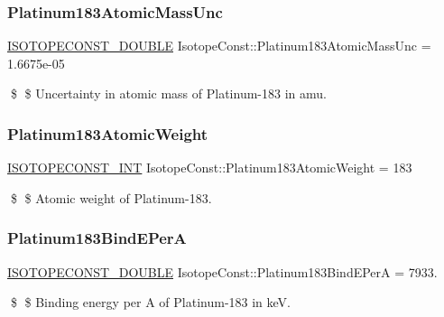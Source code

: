 \subsubsection{\texorpdfstring{Platinum183\+Atomic\+Mass\+Unc}{Platinum183AtomicMassUnc}}
{\footnotesize\ttfamily \mbox{\hyperlink{group___isotope_const-_macros_ga8f45a7272ce02c0b4c65c44636ed719a}{I\+S\+O\+T\+O\+P\+E\+C\+O\+N\+S\+T\+\_\+\+D\+O\+U\+B\+LE}} Isotope\+Const\+::\+Platinum183\+Atomic\+Mass\+Unc = 1.\+6675e-\/05}

\$ \$ Uncertainty in atomic mass of Platinum-\/183 in amu. \mbox{\label{group___isotope_const-_platinum-_pt183_gac12c7d0bb8e31dc3f8402b316737b49b}} 
\subsubsection{\texorpdfstring{Platinum183\+Atomic\+Weight}{Platinum183AtomicWeight}}
{\footnotesize\ttfamily \mbox{\hyperlink{group___isotope_const-_macros_ga5f18360b3e99483a35c32d789e62621c}{I\+S\+O\+T\+O\+P\+E\+C\+O\+N\+S\+T\+\_\+\+I\+NT}} Isotope\+Const\+::\+Platinum183\+Atomic\+Weight = 183}

\$ \$ Atomic weight of Platinum-\/183. \mbox{\label{group___isotope_const-_platinum-_pt183_ga3041b482f67ab9c53cd0342473614dca}} 
\subsubsection{\texorpdfstring{Platinum183\+Bind\+E\+PerA}{Platinum183BindEPerA}}
{\footnotesize\ttfamily \mbox{\hyperlink{group___isotope_const-_macros_ga8f45a7272ce02c0b4c65c44636ed719a}{I\+S\+O\+T\+O\+P\+E\+C\+O\+N\+S\+T\+\_\+\+D\+O\+U\+B\+LE}} Isotope\+Const\+::\+Platinum183\+Bind\+E\+PerA = 7933.}

\$ \$ Binding energy per A of Platinum-\/183 in keV. \mbox{\label{group___isotope_const-_platinum-_pt183_gaf049c9255e28839c766509fa63f72993}} 

